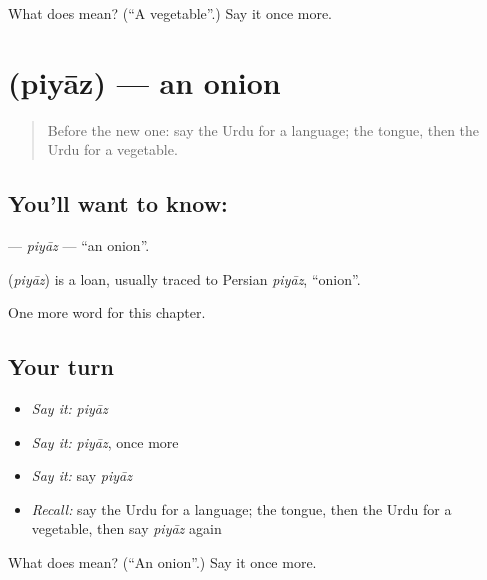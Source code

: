 \begin{tcolorbox}[breakable,colback=teal!4,colframe=teal!35!black,title={Before you move on}]
What does  mean? (\textquotedblleft{}A vegetable\textquotedblright{}.) Say it once more.
\end{tcolorbox}
\section[\texorpdfstring{\ur{پیاز} (piyāz)}{پیاز (piyāz)}]{ (piyāz) — an onion}

\label{lesson:UR-C114-piyaz}



\begin{quote}
Before the new one: say the Urdu for a language; the tongue, then the Urdu for a vegetable.
\end{quote}

\subsection*{You'll want to know: }
\textbf{} — \emph{piyāz} — \textquotedblleft{}an onion\textquotedblright{}.

\begin{cousinweb}
\textbf{} (\emph{piyāz}) is a loan, usually traced to Persian \emph{piyāz}, \textquotedblleft{}onion\textquotedblright{}.
\end{cousinweb}

\begin{grammarlens}[title={What you've built}]
One more word for this chapter.
\end{grammarlens}

\subsection*{Your turn}
\begin{itemize}
\raggedright
  \item \emph{Say it:} \emph{piyāz}
  \item \emph{Say it:} \emph{piyāz}, once more
  \item \emph{Say it:} say \emph{piyāz}
  \item \emph{Recall:} say the Urdu for a language; the tongue, then the Urdu for a vegetable, then say \emph{piyāz} again
\end{itemize}

\begin{tcolorbox}[breakable,colback=teal!4,colframe=teal!35!black,title={Before you move on}]
What does  mean? (\textquotedblleft{}An onion\textquotedblright{}.) Say it once more.
\end{tcolorbox}
